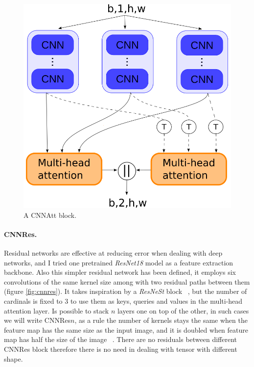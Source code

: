 \documentclass{article}
\begin{document}
\begin{figure}
    \centering
    \includegraphics[scale=.3]{images/cnn_att.png}
    \caption{A CNNAtt block.}
    \label{fig:cnnatt}
\end{figure}

\paragraph*{CNNRes.}
Residual networks are effective at reducing error when dealing with deep networks, and I tried one pretrained \textit{ResNet18} model as a feature extraction backbone.
Also this simpler residual network has been defined, it employs six convolutions of the same kernel size among with two residual paths between them (figure \ref{fig:cnnres}).
It takes inspiration by a \textit{ResNeSt} block ~\cite{zhang2020resnest}, but the number of cardinals is fixed to 3 to use them as keys, queries and values in the multi-head attention layer. 
Is possible to stack $n$ layers one on top of the other, in such cases we will write CNNRes$n$, as a rule the number of kernels stays the same when the feature map has the same size as the input image, and it is doubled when feature map has half the size of the image ~\cite{he2016deep}.
There are no residuals between different CNNRes block therefore there is no need in dealing with tensor with different shape. 
\end{document}
